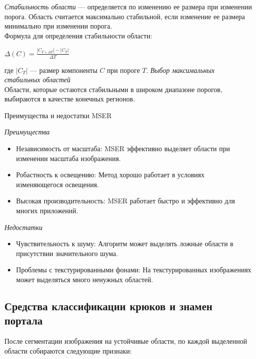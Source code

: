 \textit{Стабильность области} —  определяется по изменению ее размера при изменении порога. 
		Область считается максимально стабильной, если изменение ее размера минимально при изменении порога. \\
		Формула для определения стабильности области:
		\begin{center}
			$\Delta(C) = \frac{|C_{T+\Delta T}| - |C_T|}{\Delta T}$
		\end{center}
		где \(|C_T|\) — размер компоненты \(C\) при пороге \(T\).
\textit{Выбор максимальных стабильных областей} \\
		Области, которые остаются стабильными в широком диапазоне порогов, выбираются в качестве конечных регионов.

Преимущества и недостатки MSER\cite{MPrinse}

\textit{Преимущества}
	\begin{itemize}
		\item Независимость от масштаба: MSER эффективно выделяет области при изменении масштаба изображения.
		\item Робастность к освещению: Метод хорошо работает в условиях изменяющегося освещения.
		\item Высокая производительность: MSER работает быстро и эффективно для многих приложений.
	\end{itemize}


\textit{Недостатки}
	\begin{itemize}
		\item Чувствительность к шуму: Алгоритм может выделять ложные области в присутствии значительного шума.
		\item Проблемы с текстурированными фонами: На текстурированных изображениях может выделяться много ненужных областей.
	\end{itemize}



\subsection{Средства классификации крюков и знамен портала}

После сегментации изображения на устойчивые области, по каждой выделенной 
области собираются следующие признаки:



